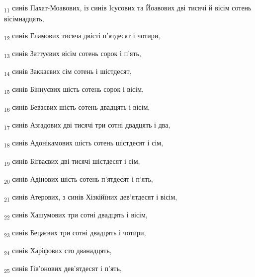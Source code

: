 \begin{tcolorbox}
\textsubscript{11} синів Пахат-Моавових, із синів Ісусових та Йоавових дві тисячі й вісім сотень вісімнадцять,
\end{tcolorbox}
\begin{tcolorbox}
\textsubscript{12} синів Еламових тисяча двісті п'ятдесят і чотири,
\end{tcolorbox}
\begin{tcolorbox}
\textsubscript{13} синів Заттуєвих вісім сотень сорок і п'ять,
\end{tcolorbox}
\begin{tcolorbox}
\textsubscript{14} синів Заккаєвих сім сотень і шістдесят,
\end{tcolorbox}
\begin{tcolorbox}
\textsubscript{15} синів Біннуєвих шість сотень сорок і вісім,
\end{tcolorbox}
\begin{tcolorbox}
\textsubscript{16} синів Беваєвих шість сотень двадцять і вісім,
\end{tcolorbox}
\begin{tcolorbox}
\textsubscript{17} синів Азґадових дві тисячі три сотні двадцять і два,
\end{tcolorbox}
\begin{tcolorbox}
\textsubscript{18} синів Адонікамових шість сотень шістдесят і сім,
\end{tcolorbox}
\begin{tcolorbox}
\textsubscript{19} синів Біґваєвих дві тисячі шістдесят і сім,
\end{tcolorbox}
\begin{tcolorbox}
\textsubscript{20} синів Адінових шість сотень п'ятдесят і п'ять,
\end{tcolorbox}
\begin{tcolorbox}
\textsubscript{21} синів Атерових, з синів Хізкійїних дев'ятдесят і вісім,
\end{tcolorbox}
\begin{tcolorbox}
\textsubscript{22} синів Хашумових три сотні двадцять і вісім,
\end{tcolorbox}
\begin{tcolorbox}
\textsubscript{23} синів Бецаєвих три сотні двадцять і чотири,
\end{tcolorbox}
\begin{tcolorbox}
\textsubscript{24} синів Харіфових сто дванадцять,
\end{tcolorbox}
\begin{tcolorbox}
\textsubscript{25} синів Ґів'онових дев'ятдесят і п'ять,
\end{tcolorbox}
